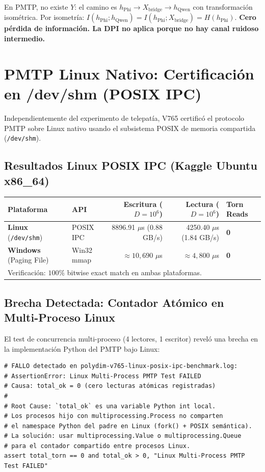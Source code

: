 En PMTP, no existe $Y$: el camino es $h_{\text{Phi}} \to X_{\text{bridge}} \to h_{\text{Qwen}}$
con transformación isométrica. Por isometría: $I(h_{\text{Phi}}; h_{\text{Qwen}}) = I(h_{\text{Phi}}; X_{\text{bridge}}) = H(h_{\text{Phi}})$.
\textbf{Cero pérdida de información. La DPI no aplica porque no hay canal ruidoso intermedio.}

\section{PMTP Linux Nativo: Certificación en /dev/shm (POSIX IPC)}

Independientemente del experimento de telepatía, V765 certificó el protocolo PMTP
sobre Linux nativo usando el subsistema POSIX de memoria compartida (\texttt{/dev/shm}).

\subsection{Resultados Linux POSIX IPC (Kaggle Ubuntu x86\_64)}


\centering


\begin{tabular}{@{}llrrl@{}}
\hline
Plataforma & API & Escritura ($D=10^6$) & Lectura ($D=10^6$) & Torn Reads \\
\hline
\textbf{Linux} (\texttt{/dev/shm})    & POSIX IPC & 8896.91 $\mu$s (0.88 GB/s)  & 4250.40 $\mu$s (1.84 GB/s) & \textbf{0} \\
\textbf{Windows} (Paging File)        & Win32 mmap & $\approx 10{,}690$ $\mu$s   & $\approx 4{,}800$ $\mu$s   & \textbf{0} \\
\hline
\multicolumn{5}{l}{\footnotesize Verificación: $100\%$ bitwise exact match en ambas plataformas.}
\end{tabular}


\subsection{Brecha Detectada: Contador Atómico en Multi-Proceso Linux}

El test de concurrencia multi-proceso (4 lectores, 1 escritor) reveló una brecha
en la implementación Python del PMTP bajo Linux:

\begin{verbatim}
# FALLO detectado en polydim-v765-linux-posix-ipc-benchmark.log:
# AssertionError: Linux Multi-Process PMTP Test FAILED
# Causa: total_ok = 0 (cero lecturas atómicas registradas)
#
# Root Cause: `total_ok` es una variable Python int local.
# Los procesos hijo con multiprocessing.Process no comparten
# el namespace Python del padre en Linux (fork() + POSIX semántica).
# La solución: usar multiprocessing.Value o multiprocessing.Queue
# para el contador compartido entre procesos Linux.
assert total_torn == 0 and total_ok > 0, "Linux Multi-Process PMTP Test FAILED"
\end{verbatim}

